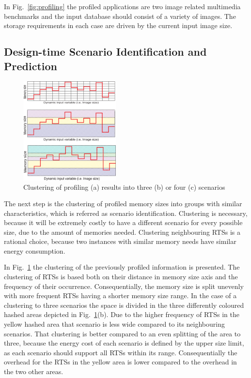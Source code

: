 \documentclass[a4paper,conference]{IEEEtran}
\begin{document}
In Fig.~\ref{fig:profiling} the profiled applications are two image related multimedia benchmarks and the input database should consist of a variety of images. The storage requirements in each case are driven by the current input image size. 

\subsection{Design-time Scenario Identification and Prediction}

\begin{figure}[!t]
\centering
\includegraphics[width=0.45\textwidth]{Images/1Dclustering.eps}
\caption{Clustering of profiling (a) results into three (b) or four (c) scenarios}
\label{fig:clustering}
\end{figure}

The next step is the clustering of profiled memory sizes into groups with similar characteristics, which is referred as scenario identification. Clustering is necessary, because it will be extremely costly to have a different scenario for every possible size, due to the amount of memories needed. Clustering neighbouring RTSs is a rational choice, because two instances with similar memory needs have similar energy consumption. 

In Fig.~\ref{fig:clustering} the clustering of the previously profiled information is presented. The clustering of RTSs is based both on their distance in memory size axis and the frequency of their occurrence. Consequentially, the memory size is split unevenly with more frequent RTSs having a shorter memory size range. In the case of a clustering to three scenarios the space is divided in the three differently coloured hashed areas depicted in Fig.~\ref{fig:clustering}(b). Due to the higher frequency of RTSs in the yellow hashed area that scenario is less wide compared to its neighbouring scenarios. That clustering is better compared to an even splitting of the area to three, because the energy cost of each scenario is defined by the upper size limit, as each scenario should support all RTSs within its range. Consequentially the overhead for the RTSs in the yellow area is lower compared to the overhead in the two other areas.
\end{document}
